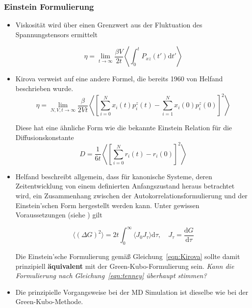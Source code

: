 \documentclass[a4paper, 10pt, 
               numbers=noenddot, toc=graduated,
               headsepline=true, footsepline=true,
               twoside=false, titlepage=true, 
               bibliography=totoc]{scrartcl}
\newcommand{\refeqn}[1]  {Gleichung~\ref{#1}}
\begin{document}
	\subsubsection{Einstein Formulierung}
		\begin{itemize}
			 \item Viskosität wird über einen Grenzwert aus der Fluktuation des Spannungstensors ermittelt \cite{Tenney2010}
			 
			 	\begin{equation}\label{eqn:tenney}
					\eta = \lim_{t\to\infty} \frac{\beta V}{2 t} \left\langle \int_0^t P_{xz}(t')\mathrm{d}t' \right\rangle
				\end{equation}
				
			 \item Kirova \cite{Kirova2015} verweist auf eine andere Formel, die bereits 1960 von Helfand \cite{Helfand1960} beschrieben wurde.
			    \begin{equation}\label{eqn:Kirova}
					\eta = \lim_{N,V,t\to\infty} \frac{\beta}{2 V t} \left\langle \left[\sum_{i=0}^N x_i(t) p_i^z(t) - \sum_{i=1}^N x_i(0) p_i^z(0) \right]^2 \right\rangle
				\end{equation}
				
				Diese hat eine ähnliche Form wie die bekannte Einstein Relation für die Diffusionskonstante
				\begin{equation}
					D = \frac{1}{6t} \left\langle \left[ \sum_{i=0}^N r_i(t) - r_i(0) \right]^2 \right\rangle
				\end{equation}
				
			\item Helfand \cite{Helfand1960} beschreibt allgemein, dass für kanonische Systeme, deren Zeitentwicklung von einem definierten Anfangszustand heraus betrachtet wird, ein Zusammenhang zwischen der Autokorrelationsformulierung und der Einstein'schen Form hergestellt werden kann. Unter gewissen Voraussetzungen (siehe  \cite{Helfand1960})  gilt
			
				\begin{equation}
					\langle (\Delta G)^2 \rangle = 2 t \int_0^\infty \langle J_0 J_\tau \rangle \mathrm{d} \tau,\quad J_\tau = \frac{ \mathrm{d} G }{\mathrm{d} \tau}
				\end{equation}
				
				Die Einstein'sche Formulierung gemäß \refeqn{eqn:Kirova} sollte damit prinzipiell \textbf{äquivalent} mit der Green-Kubo-Formulierung sein. \textit{Kann die Formulierung nach \refeqn{eqn:tenney} überhaupt stimmen?}
				
			 
			 \item Die prinzipielle Vorgangsweise bei der MD Simulation ist dieselbe wie bei der Green-Kubo-Methode.
		\end{itemize}
\end{document}
